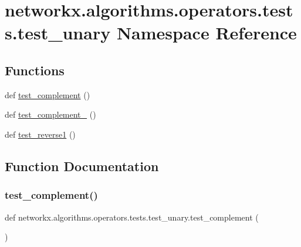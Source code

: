 \hypertarget{namespacenetworkx_1_1algorithms_1_1operators_1_1tests_1_1test__unary}{}\section{networkx.\+algorithms.\+operators.\+tests.\+test\+\_\+unary Namespace Reference}
\label{namespacenetworkx_1_1algorithms_1_1operators_1_1tests_1_1test__unary}
\subsection*{Functions}
\begin{DoxyCompactItemize}
\item 
def \hyperlink{namespacenetworkx_1_1algorithms_1_1operators_1_1tests_1_1test__unary_adf60151369f060daa3d98a2364a2e455}{test\+\_\+complement} ()
\item 
def \hyperlink{namespacenetworkx_1_1algorithms_1_1operators_1_1tests_1_1test__unary_a3b5169302f59737533a7d404c159286e}{test\+\_\+complement\+\_} ()
\item 
def \hyperlink{namespacenetworkx_1_1algorithms_1_1operators_1_1tests_1_1test__unary_a69dd37ea288775c330ff14c22aa0476c}{test\+\_\+reverse1} ()
\end{DoxyCompactItemize}


\subsection{Function Documentation}
\mbox{\label{namespacenetworkx_1_1algorithms_1_1operators_1_1tests_1_1test__unary_adf60151369f060daa3d98a2364a2e455}} 
\subsubsection{\texorpdfstring{test\+\_\+complement()}{test\_complement()}}
{\footnotesize\ttfamily def networkx.\+algorithms.\+operators.\+tests.\+test\+\_\+unary.\+test\+\_\+complement (\begin{DoxyParamCaption}{ }\end{DoxyParamCaption})}

